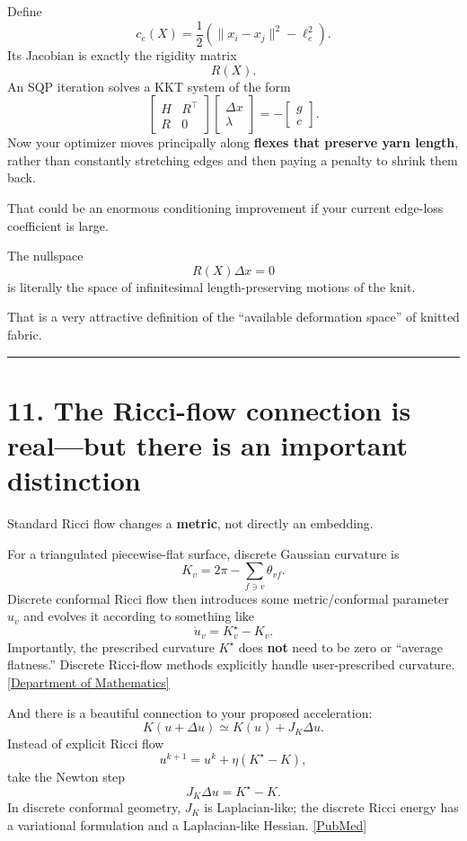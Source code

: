\documentclass[11pt]{article}
\begin{document}
Define
\[
c_e(X)
=
\frac12
\left(
\|x_i-x_j\|^2-\ell_e^2
\right).
\]
Its Jacobian is exactly the rigidity matrix
\[
R(X).
\]
An SQP iteration solves a KKT system of the form
\[
\boxed{
\begin{bmatrix}
H & R^\top\\
R & 0
\end{bmatrix}
\begin{bmatrix}
\Delta x\\
\lambda
\end{bmatrix}
=
-
\begin{bmatrix}
g\\
c
\end{bmatrix}.
}
\]
Now your optimizer moves principally along \textbf{flexes that preserve
yarn length}, rather than constantly stretching edges and then paying a
penalty to shrink them back.

That could be an enormous conditioning improvement if your current
edge-loss coefficient is large.

The nullspace
\[
R(X)\Delta x=0
\]
is literally the space of infinitesimal length-preserving motions of the
knit.

That is a very attractive definition of the ``available deformation
space'' of knitted fabric.

\bigskip\hrule

\section*{11. The Ricci-flow connection is real---but there is an important distinction}

Standard Ricci flow changes a \textbf{metric}, not directly an embedding.

For a triangulated piecewise-flat surface, discrete Gaussian curvature is
\[
K_v
=
2\pi-\sum_{f\ni v}\theta_{vf}.
\]
Discrete conformal Ricci flow then introduces some metric/conformal
parameter \(u_v\) and evolves it according to something like
\[
\dot u_v=K_v^\star-K_v.
\]
Importantly, the prescribed curvature \(K^\star\) does \textbf{not} need to
be zero or ``average flatness.'' Discrete Ricci-flow methods explicitly
handle user-prescribed curvature.
\href{https://sites.math.rutgers.edu/~fluo/mpapers/combinatorial%20Ricci%20flow%20in%20dimension%202.pdf?utm_source=chatgpt.com}{[Department of Mathematics]}

And there is a beautiful connection to your proposed acceleration:
\[
K(u+\Delta u)
\simeq
K(u)+J_K\Delta u.
\]
Instead of explicit Ricci flow
\[
u^{k+1}=u^k+\eta(K^\star-K),
\]
take the Newton step
\[
\boxed{
J_K\Delta u
=
K^\star-K.
}
\]
In discrete conformal geometry, \(J_K\) is Laplacian-like; the discrete
Ricci energy has a variational formulation and a Laplacian-like Hessian.
\href{https://pubmed.ncbi.nlm.nih.gov/18599915/?utm_source=chatgpt.com}{[PubMed]}
\end{document}

